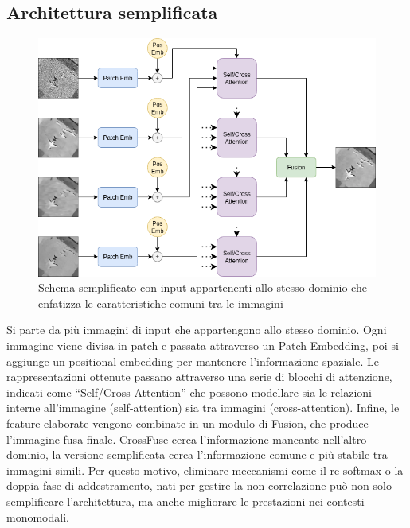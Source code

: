 \subsection{Architettura semplificata}
\begin{figure}[H]
  \centering
  \includegraphics[width=1.0\textwidth]{utils/schema.png}
  \caption{Schema semplificato con input appartenenti allo stesso dominio che enfatizza le caratteristiche comuni tra le immagini} 
  \label{fig:schema}
\end{figure}
Si parte da più immagini di input che appartengono allo stesso dominio.
Ogni immagine viene divisa in patch e passata attraverso un Patch Embedding, poi si aggiunge un positional embedding per mantenere l’informazione spaziale.
Le rappresentazioni ottenute passano attraverso una serie di blocchi di attenzione, indicati come “Self/Cross Attention” che possono modellare sia le relazioni interne all’immagine (self-attention) sia tra immagini (cross-attention).
Infine, le feature elaborate vengono combinate in un modulo di Fusion, che produce l’immagine fusa finale.
CrossFuse cerca l’informazione mancante nell’altro dominio, la versione semplificata cerca l’informazione comune e più stabile tra immagini simili.
Per questo motivo, eliminare meccanismi come il re-softmax o la doppia fase di addestramento, nati per gestire la non-correlazione 
può non solo semplificare l’architettura, ma anche migliorare le prestazioni nei contesti monomodali.



 

